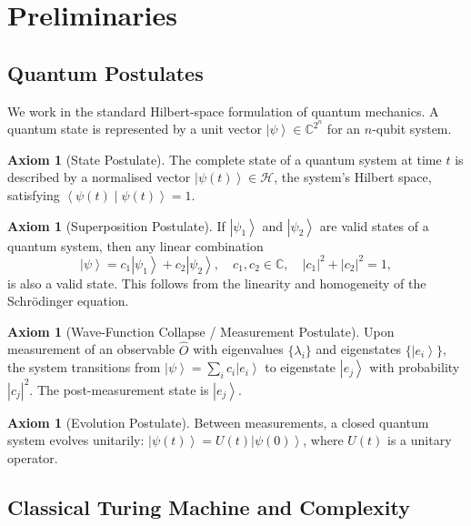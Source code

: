\documentclass[11pt]{article}
\theoremstyle{plain}
\theoremstyle{definition}
\newtheorem{axiom}[theorem]{Axiom}
\theoremstyle{remark}
\newcommand{\ket}[1]{\left| #1 \right\rangle}
\newcommand{\braket}[2]{\left\langle #1 \mid #2 \right\rangle}
\newcommand{\Complex}{\mathbb{C}}
\begin{document}
\section{Preliminaries}
\label{sec:prelim}

\subsection{Quantum Postulates}

We work in the standard Hilbert-space formulation of quantum mechanics.  A
quantum state is represented by a unit vector $\ket{\psi} \in \Complex^{2^n}$
for an $n$-qubit system.

\begin{axiom}[State Postulate]
  The complete state of a quantum system at time $t$ is described by a
  normalised vector $\ket{\psi(t)} \in \mathcal{H}$, the system's Hilbert
  space, satisfying $\braket{\psi(t)}{\psi(t)} = 1$.
\end{axiom}

\begin{axiom}[Superposition Postulate]
  If $\ket{\psi_1}$ and $\ket{\psi_2}$ are valid states of a quantum system,
  then any linear combination
  \[
    \ket{\psi} = c_1 \ket{\psi_1} + c_2 \ket{\psi_2},
    \quad c_1, c_2 \in \Complex, \quad |c_1|^2 + |c_2|^2 = 1,
  \]
  is also a valid state.  This follows from the linearity and homogeneity of
  the Schr\"{o}dinger equation.
\end{axiom}

\begin{axiom}[Wave-Function Collapse / Measurement Postulate]
  Upon measurement of an observable $\hat{O}$ with eigenvalues
  $\{\lambda_i\}$ and eigenstates $\{\ket{e_i}\}$, the system transitions
  from $\ket{\psi} = \sum_i c_i \ket{e_i}$ to eigenstate $\ket{e_j}$ with
  probability $|c_j|^2$.  The post-measurement state is $\ket{e_j}$.
\end{axiom}

\begin{axiom}[Evolution Postulate]
  Between measurements, a closed quantum system evolves unitarily:
  $\ket{\psi(t)} = U(t)\ket{\psi(0)}$, where $U(t)$ is a unitary operator.
\end{axiom}

\subsection{Classical Turing Machine and Complexity}
\end{document}
